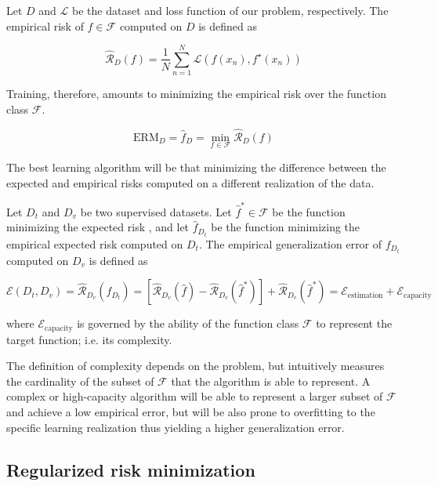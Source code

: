 \begin{definition} Let $D$ and $\mathcal{L}$ be the dataset and loss function of our problem, respectively. The empirical risk of $f \in \mathcal{F}$
    computed on $D$ is defined as

    $$
    \hat{\mathcal{R}}_D(f)=\frac{1}{N}\sum_{n=1}^{N}\mathcal{L}(f(x_{n}),f^{\star}(x_{n}))
    $$
\end{definition}

Training, therefore, amounts to minimizing the empirical risk over the function class $\mathcal{F}$.

$$
\text{ERM}_D = \hat{f}_D = \min_{f \in \mathcal{F}} \hat{\mathcal{R}}_D(f)
$$

The best learning algorithm will be that minimizing the difference between the 
expected and empirical risks computed on a different realization of the data. 

\begin{definition} Let $D_{t}$ and $D_v$ be two supervised datasets. Let $\hat{f}^* \in \mathcal{F}$ be the function minimizing the expected risk
    , and let $\hat{f}_{D_t}$ be the function minimizing the empirical expected risk computed on $D_t$. The empirical generalization error of $f_{D_t}$ computed on $D_v$ is defined as

    $$
    \mathcal{E}(D_t, D_v) = \hat{\mathcal{R}}_{D_v}(\hat{f}_{D_t}) = [\hat{\mathcal{R}}_{D_v}(\hat{f}) - \hat{\mathcal{R}}_{D_v}(\hat{f}^*)] + \hat{\mathcal{R}}_{D_v}(\hat{f}^*) = \mathcal{E}_{\text{estimation}}+ \mathcal{E}_{\text{capacity}}
    $$

    where $\mathcal{E}_{\text{capacity}}$ is governed by the ability of the function class $\mathcal{F}$ to represent the target function; i.e. its complexity.
\end{definition}


The definition of complexity depends on the problem, but intuitively measures the cardinality of the
subset of $\mathcal{F}$ that the algorithm is able to represent. A complex or high-capacity algorithm will
be able to represent a larger subset of $\mathcal{F}$ and achieve a low empirical error, but will be also
prone to overfitting to the specific learning realization thus yielding a higher generalization error. 

\subsection{Regularized risk minimization}\label{sec:rrm}

